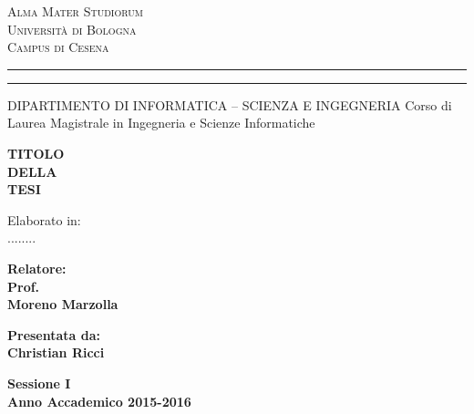 \documentclass[12pt,a4paper,openright,twoside]{report}
\newcommand{\xstudent}{Christian Ricci}
\newcommand{\xsupervisor}{Moreno Marzolla}
\begin{document}


\oddsidemargin=25pt

\begin{titlepage}
\begin{center}
    {\Large{\textsc{Alma Mater Studiorum}}}\\
    {\Large{\textsc{Universit\`a di Bologna}}} \\
    {\textsc{Campus di Cesena}}
    \rule[0.1cm]{14cm}{0.1mm}
    \rule[0.5cm]{14cm}{0.6mm}
    DIPARTIMENTO DI INFORMATICA – SCIENZA E INGEGNERIA
    Corso di Laurea Magistrale in Ingegneria e Scienze Informatiche
\end{center}

\vspace{15mm}

\begin{center}
    {\LARGE{\bf TITOLO}} \vspace{3mm} \\
    {\LARGE{\bf DELLA}} \vspace{3mm} \\
    {\LARGE{\bf TESI}}
\end{center}

\vspace{15mm}

\begin{center}
     \large{ Elaborato in:\\ ........\\}
\end{center}

\vspace{20mm}
\par
\noindent

\begin{minipage}[t]{0.47\textwidth}
    {\large{\bf Relatore:\\ Prof.\\ \xsupervisor}}
\end{minipage}
\hfill
\begin{minipage}[t]{0.47\textwidth}\raggedleft
    {\large{\bf Presentata da:\\ \xstudent}} \end{minipage}
\vspace{20mm}
\begin{center}
    \large{\bf Sessione I\\ Anno Accademico 2015-2016}
\end{center}
\end{titlepage}
\end{document}
